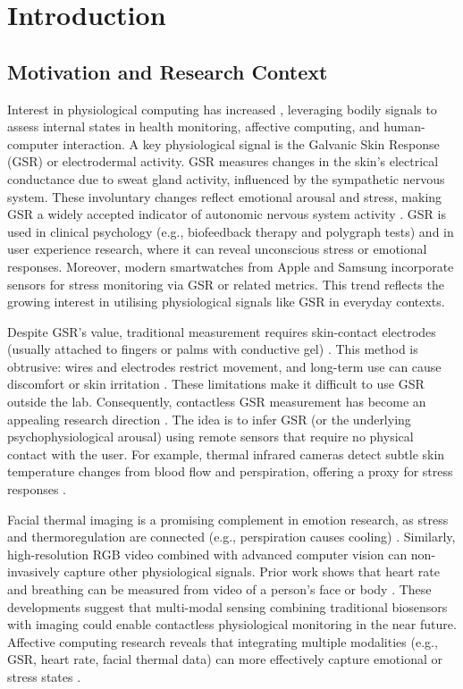 \chapter{Introduction}

\section{Motivation and Research Context}
Interest in physiological computing has increased \textemdash, leveraging bodily signals to assess internal states in health monitoring, affective computing, and human-computer interaction. A key physiological signal is the Galvanic Skin Response (GSR) or electrodermal activity. GSR measures changes in the skin's electrical conductance due to sweat gland activity, influenced by the sympathetic nervous system. These involuntary changes reflect emotional arousal and stress, making GSR a widely accepted indicator of autonomic nervous system activity \cite{ref1}. GSR is used in clinical psychology (e.g., biofeedback therapy and polygraph tests) and in user experience research, where it can reveal unconscious stress or emotional responses. Moreover, modern smartwatches from Apple and Samsung incorporate sensors for stress monitoring via GSR or related metrics. This trend reflects the growing interest in utilising physiological signals like GSR in everyday contexts.

Despite GSR's value, traditional measurement requires skin-contact electrodes (usually attached to fingers or palms with conductive gel) \cite{ref3}. This method is obtrusive: wires and electrodes restrict movement, and long-term use can cause discomfort or skin irritation \cite{ref3}. These limitations make it difficult to use GSR outside the lab. Consequently, contactless GSR measurement has become an appealing research direction \cite{ref4}. The idea is to infer GSR (or the underlying psychophysiological arousal) using remote sensors that require no physical contact with the user. For example, thermal infrared cameras detect subtle skin temperature changes from blood flow and perspiration, offering a proxy for stress responses \cite{ref5}.

Facial thermal imaging is a promising complement in emotion research, as stress and thermoregulation are connected (e.g., perspiration causes cooling) \cite{ref5}. Similarly, high-resolution RGB video combined with advanced computer vision can non-invasively capture other physiological signals. Prior work shows that heart rate and breathing can be measured from video of a person's face or body \cite{ref6}. These developments suggest that multi-modal sensing \textemdash combining traditional biosensors with imaging \textemdash could enable contactless physiological monitoring in the near future. Affective computing research reveals that integrating multiple modalities (e.g., GSR, heart rate, facial thermal data) can more effectively capture emotional or stress states \cite{ref1}.

